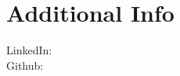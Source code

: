 
\section{Additional Info}
LinkedIn:  \href{https://www.linkedin.com/in/danielenussbaum}{} \\
Github: \href{https://github.com/dnussbaum}{} \\
\sectionsep
